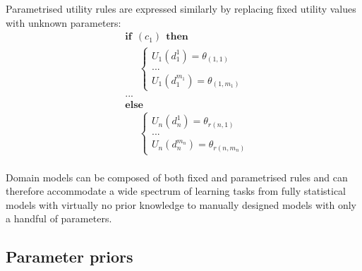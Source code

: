 Parametrised utility rules are expressed similarly by replacing fixed utility values with unknown parameters:
\begin{equation}
\begin{aligned}
& \textbf{if} \ \ (c_{1}) \ \ \textbf{then} \\ 
& \;\;\;\;\; \begin{cases}
U_1(d_1^1) = \theta_{(1,1)} \\
 ... \\
U_1(d_1^{m_1}) = \theta_{(1,m_1)}
\end{cases} \\[3mm]
& ...  \\
& \textbf{else} \\
& \;\;\;\;\; \begin{cases}
U_n(d_n^1) = \theta_{r(n,1)} \\
... \\
U_n(d_n^{m_n}) = \theta_{r(n,m_n)}
\end{cases}
\end{aligned}
\end{equation} \\

Domain models can be composed of both fixed and parametrised rules and can therefore accommodate a wide spectrum of learning tasks from fully statistical models with virtually no prior knowledge to manually designed models with only a handful of parameters. 

\subsection{Parameter priors}
\label{sec:rule-params-priors}

